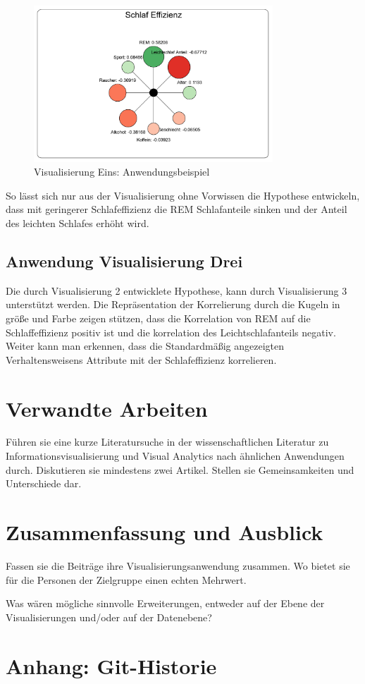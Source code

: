 \documentclass[usegeometry=true]{scrartcl}
\begin{document}
\begin{figure}[h]

  \centering
  \includegraphics [width = 0.8\textwidth]{Bsp_ImpactGraph.PNG}
  \caption{Visualisierung Eins: Anwendungsbeispiel}

  
\end{figure}

So lässt sich nur aus der Visualisierung ohne Vorwissen die Hypothese entwickeln, dass mit geringerer Schlafeffizienz die REM Schlafanteile sinken und der Anteil des leichten Schlafes erhöht wird.

\subsection{Anwendung Visualisierung Drei}

Die durch Visualisierung 2 entwicklete Hypothese, kann durch Visualisierung 3 unterstützt werden. 
Die Repräsentation der Korrelierung durch die Kugeln  in größe und Farbe zeigen stützen, dass die Korrelation von REM auf die Schlaffeffizienz positiv ist und die korrelation des Leichtschlafanteils negativ. 
Weiter kann man erkennen, dass die Standardmäßig angezeigten Verhaltensweisens Attribute mit der Schlafeffizienz korrelieren. 


\section{Verwandte Arbeiten}
Führen sie eine kurze Literatursuche in der wissenschaftlichen Literatur zu Informationsvisualisierung und Visual Analytics nach ähnlichen Anwendungen durch. Diskutieren sie mindestens zwei Artikel. Stellen sie Gemeinsamkeiten und Unterschiede dar.

\section{Zusammenfassung und Ausblick}
Fassen sie die Beiträge ihre Visualisierungsanwendung zusammen. Wo bietet sie für die Personen der Zielgruppe einen echten Mehrwert.

Was wären mögliche sinnvolle Erweiterungen, entweder auf der Ebene der Visualisierungen und/oder auf der Datenebene?

\section*{Anhang: Git-Historie}

\printbibliography
\end{document}
